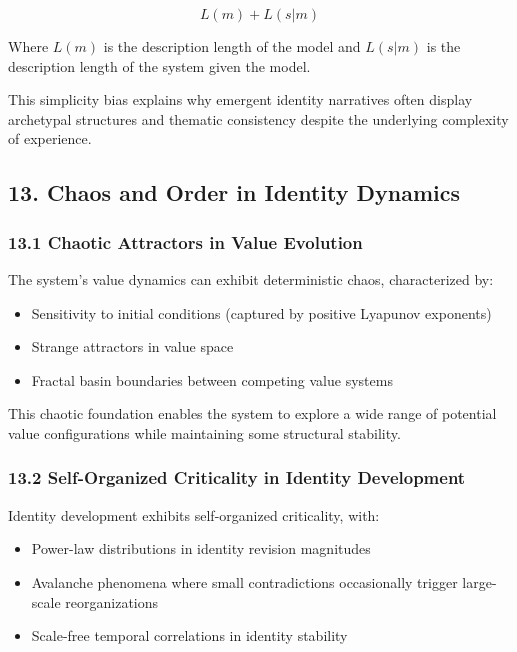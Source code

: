 \documentclass[
]{article}
\providecommand{\tightlist}{%
  \setlength{\itemsep}{0pt}\setlength{\parskip}{0pt}}
\begin{document}
\[L(m) + L(s|m)\]

Where \(L(m)\) is the description length of the model and \(L(s|m)\) is
the description length of the system given the model.

This simplicity bias explains why emergent identity narratives often
display archetypal structures and thematic consistency despite the
underlying complexity of experience.

\subsection{13. Chaos and Order in Identity
Dynamics}\label{chaos-and-order-in-identity-dynamics}

\subsubsection{13.1 Chaotic Attractors in Value
Evolution}\label{chaotic-attractors-in-value-evolution}

The system's value dynamics can exhibit deterministic chaos,
characterized by:

\begin{itemize}
\tightlist
\item
  Sensitivity to initial conditions (captured by positive Lyapunov
  exponents)
\item
  Strange attractors in value space
\item
  Fractal basin boundaries between competing value systems
\end{itemize}

This chaotic foundation enables the system to explore a wide range of
potential value configurations while maintaining some structural
stability.

\subsubsection{13.2 Self-Organized Criticality in Identity
Development}\label{self-organized-criticality-in-identity-development}

Identity development exhibits self-organized criticality, with:

\begin{itemize}
\tightlist
\item
  Power-law distributions in identity revision magnitudes
\item
  Avalanche phenomena where small contradictions occasionally trigger
  large-scale reorganizations
\item
  Scale-free temporal correlations in identity stability
\end{itemize}
\end{document}
